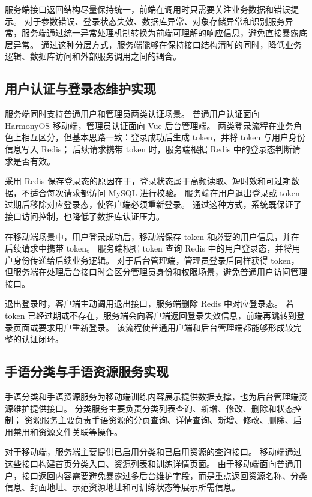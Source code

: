 服务端接口返回结构尽量保持统一，前端在调用时只需要关注业务数据和错误提示。
对于参数错误、登录状态失效、数据库异常、对象存储异常和识别服务异常，服务端通过统一异常处理机制转换为前端可理解的响应信息，避免直接暴露底层异常。
通过这种分层方式，服务端能够在保持接口结构清晰的同时，降低业务逻辑、数据库访问和外部服务调用之间的耦合。

\subsection{用户认证与登录态维护实现}

服务端同时支持普通用户和管理员两类认证场景。
普通用户认证面向 HarmonyOS 移动端，管理员认证面向 Vue 后台管理端。
两类登录流程在业务角色上相互区分，但基本思路一致：登录成功后生成 token，并将 token 与用户身份信息写入 Redis；
后续请求携带 token 时，服务端根据 Redis 中的登录态判断请求是否有效。

采用 Redis 保存登录态的原因在于，登录状态属于高频读取、短时效和可过期数据，不适合每次请求都访问 MySQL 进行校验。
服务端在用户退出登录或 token 过期后移除对应登录态，使客户端必须重新登录。
通过这种方式，系统既保证了接口访问控制，也降低了数据库认证压力。

在移动端场景中，用户登录成功后，移动端保存 token 和必要的用户信息，并在后续请求中携带 token。
服务端根据 token 查询 Redis 中的用户登录态，并将用户身份传递给后续业务逻辑。
对于后台管理端，管理员登录后同样获得 token，但服务端在处理后台接口时会区分管理员身份和权限场景，避免普通用户访问管理接口。

退出登录时，客户端主动调用退出接口，服务端删除 Redis 中对应登录态。
若 token 已经过期或不存在，服务端会向客户端返回登录失效信息，前端再跳转到登录页面或要求用户重新登录。
该流程使普通用户端和后台管理端都能够形成较完整的认证闭环。

\subsection{手语分类与手语资源服务实现}

手语分类和手语资源服务为移动端训练内容展示提供数据支撑，也为后台管理端资源维护提供接口。
分类服务主要负责分类列表查询、新增、修改、删除和状态控制；
资源服务主要负责手语资源的分页查询、详情查询、新增、修改、删除、启用禁用和资源文件关联等操作。

对于移动端，服务端主要提供已启用分类和已启用资源的查询接口。
移动端通过这些接口构建首页分类入口、资源列表和训练详情页面。
由于移动端面向普通用户，接口返回内容需要避免暴露过多后台维护字段，而是重点返回资源名称、分类信息、封面地址、示范资源地址和可训练状态等展示所需信息。

